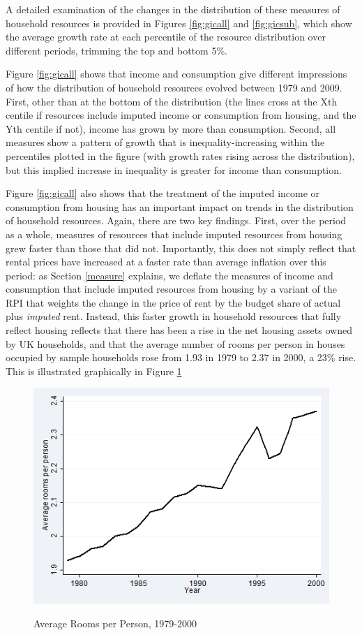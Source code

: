 A detailed examination of the changes in the distribution of these measures of household resources is provided in Figures \ref{fig:gicall} and \ref{fig:gicsub}, which show the average growth rate at each percentile of the resource distribution over different periods, trimming the top and bottom 5\%.

Figure \ref{fig:gicall} shows that income and consumption give different impressions of how the distribution of household resources evolved between 1979 and 2009. First, other than at the bottom of the distribution (the lines cross at the Xth centile if resources include imputed income or consumption from housing, and the Yth centile if not), income has grown by more than consumption. Second, all measures show a pattern of growth that is inequality-increasing within the percentiles plotted in the figure (with growth rates rising across the distribution), but this implied increase in inequality is greater for income than consumption.

Figure \ref{fig:gicall} also shows that the treatment of the imputed income or consumption from housing has an important impact on trends in the distribution of household resources. Again, there are two key findings. First, over the period as a whole, measures of resources that include imputed resources from housing grew faster than those that did not. Importantly, this does not simply reflect that rental prices have increased at a faster rate than average inflation over this period: as Section \ref{measure} explains, we deflate the measures of income and consumption that include imputed resources from housing by a variant of the RPI that weights the change in the price of rent by the budget share of actual plus \emph{imputed} rent. Instead, this faster growth in household resources that fully reflect housing reflects that there has been a rise in the net housing assets owned by UK households, and that the average number of rooms per person in houses occupied by sample households rose from 1.93 in 1979 to 2.37 in 2000, a 23\% rise. This is illustrated graphically in Figure  \ref{fig:room_time}

\begin{figure}
\caption{Average Rooms per Person, 1979-2000}
\centering
\includegraphics[width=0.7\linewidth]{pictures/rooms_pp.png}
\label{fig:room_time}
\end{figure}

